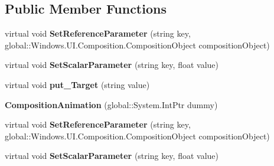 \subsection*{Public Member Functions}
\begin{DoxyCompactItemize}
\item 
\mbox{\label{class_windows_1_1_u_i_1_1_composition_1_1_composition_animation_a6aef4c6354f81b68470b59c2583862d0}} 
virtual void {\bfseries Set\+Reference\+Parameter} (string key, global\+::\+Windows.\+U\+I.\+Composition.\+Composition\+Object composition\+Object)
\item 
\mbox{\label{class_windows_1_1_u_i_1_1_composition_1_1_composition_animation_a9338e6aa927cdc031e0533dfec0fc5bb}} 
virtual void {\bfseries Set\+Scalar\+Parameter} (string key, float value)
\item 
\mbox{\label{class_windows_1_1_u_i_1_1_composition_1_1_composition_animation_a59f79df972c8170dc1fd9329bb0fdb0c}} 
virtual void {\bfseries put\+\_\+\+Target} (string value)
\item 
\mbox{\label{class_windows_1_1_u_i_1_1_composition_1_1_composition_animation_ae967a843f8543e354ae2d891eaad7df5}} 
{\bfseries Composition\+Animation} (global\+::\+System.\+Int\+Ptr dummy)
\item 
\mbox{\label{class_windows_1_1_u_i_1_1_composition_1_1_composition_animation_a6aef4c6354f81b68470b59c2583862d0}} 
virtual void {\bfseries Set\+Reference\+Parameter} (string key, global\+::\+Windows.\+U\+I.\+Composition.\+Composition\+Object composition\+Object)
\item 
\mbox{\label{class_windows_1_1_u_i_1_1_composition_1_1_composition_animation_a9338e6aa927cdc031e0533dfec0fc5bb}} 
virtual void {\bfseries Set\+Scalar\+Parameter} (string key, float value)
\item 
\mbox{\label{class_windows_1_1_u_i_1_1_composition_1_1_composition_animation_a59f79df972c8170dc1fd9329bb0fdb0c}} 

\end{DoxyCompactItemize}
